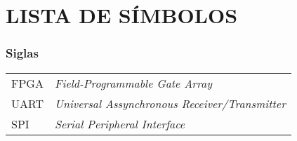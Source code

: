                       

\chapter*{LISTA DE SÍMBOLOS} %

\subsection*{Siglas}

\begin{tabular}{p{}p{}}
FPGA & \textit{Field-Programmable Gate Array}\\
UART & \textit{Universal Assynchronous Receiver/Transmitter}\\
SPI & \textit{Serial Peripheral Interface}\\
\end{tabular}

